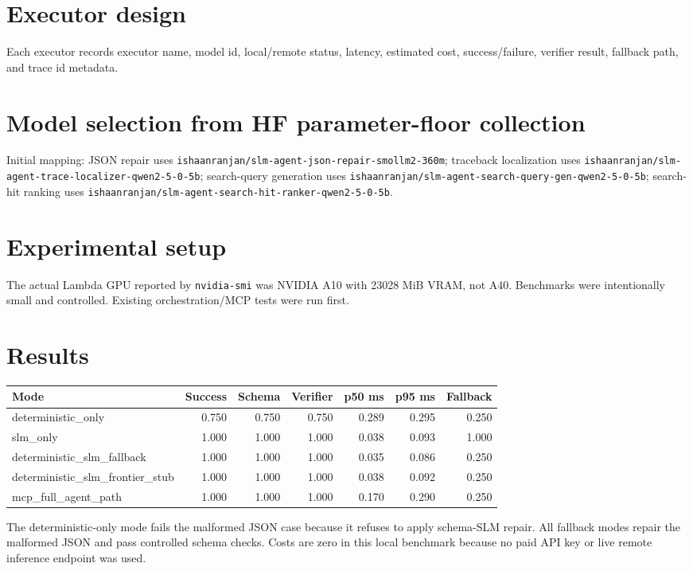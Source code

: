\documentclass[11pt]{article}
\begin{document}
\section{Executor design}
Each executor records executor name, model id, local/remote status, latency, estimated cost, success/failure, verifier result, fallback path, and trace id metadata.
\section{Model selection from HF parameter-floor collection}
Initial mapping: JSON repair uses \texttt{ishaanranjan/slm-agent-json-repair-smollm2-360m}; traceback localization uses \texttt{ishaanranjan/slm-agent-trace-localizer-qwen2-5-0-5b}; search-query generation uses \texttt{ishaanranjan/slm-agent-search-query-gen-qwen2-5-0-5b}; search-hit ranking uses \texttt{ishaanranjan/slm-agent-search-hit-ranker-qwen2-5-0-5b}.
\section{Experimental setup}
The actual Lambda GPU reported by \texttt{nvidia-smi} was NVIDIA A10 with 23028 MiB VRAM, not A40. Benchmarks were intentionally small and controlled. Existing orchestration/MCP tests were run first.
\section{Results}
\begin{center}
\begin{tabular}{lrrrrrr}
\toprule
Mode & Success & Schema & Verifier & p50 ms & p95 ms & Fallback \\
\midrule
deterministic\_only & 0.750 & 0.750 & 0.750 & 0.289 & 0.295 & 0.250 \\
slm\_only & 1.000 & 1.000 & 1.000 & 0.038 & 0.093 & 1.000 \\
deterministic\_slm\_fallback & 1.000 & 1.000 & 1.000 & 0.035 & 0.086 & 0.250 \\
deterministic\_slm\_frontier\_stub & 1.000 & 1.000 & 1.000 & 0.038 & 0.092 & 0.250 \\
mcp\_full\_agent\_path & 1.000 & 1.000 & 1.000 & 0.170 & 0.290 & 0.250 \\
\bottomrule
\end{tabular}
\end{center}
The deterministic-only mode fails the malformed JSON case because it refuses to apply schema-SLM repair. All fallback modes repair the malformed JSON and pass controlled schema checks. Costs are zero in this local benchmark because no paid API key or live remote inference endpoint was used.
\end{document}
